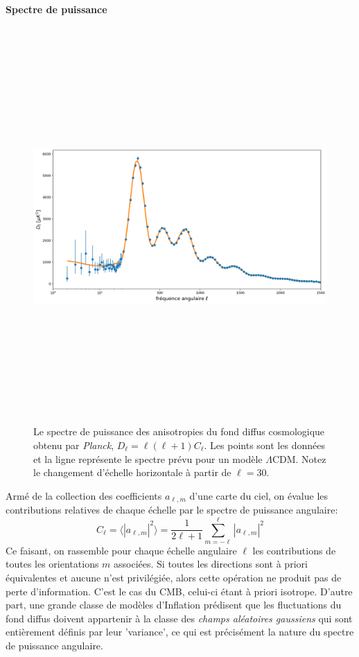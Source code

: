 \paragraph{Spectre de puissance}
\begin{figure}[htbp]
	\centering
		\includegraphics[height=15cm]{figs/cl2015.png}
		\caption[Le spectre de puissance des anisotropies du fond diffus cosmologique obtenu par \textit{Planck}.]{Le spectre de puissance des anisotropies du fond diffus cosmologique obtenu par \textit{Planck}, $D_\ell=\ell(\ell+1)C_\ell$. Les points sont les données et la ligne représente le spectre prévu pour un modèle $\Lambda$CDM. Notez le changement d'échelle horizontale à partir de $\ell=30$.}
	\label{f:cl}
\end{figure}

Armé de la collection des coefficients $a_{\ell,m}$ d'une carte du ciel, on évalue les contributions relatives de chaque échelle par le spectre de puissance angulaire:
\begin{equation}
C_\ell=\langle |a_{\ell,m}|^2\rangle=\frac{1}{2\ell+1}\sum_{m=-\ell}^{\ell} |a_{\ell,m}|^2
\end{equation}
Ce faisant, on rassemble pour chaque échelle angulaire $\ell$ les contributions de toutes les orientations $m$ associées. Si toutes les directions sont à priori équivalentes et aucune n'est privilégiée, alors cette opération ne produit pas de perte d'information. C'est le cas du CMB, celui-ci étant à priori isotrope. D'autre part, une grande classe de modèles d'Inflation prédisent que les fluctuations du fond diffus doivent appartenir à la classe des \textit{champs aléatoires gaussiens} qui sont entièrement définis par leur 'variance', ce qui est précisément la nature du spectre de puissance angulaire.

